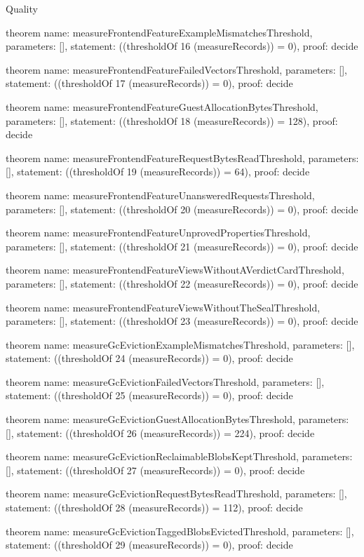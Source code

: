 \begin{lexlean}{Quality}
\begin{semanticmodule}
theorem{
  name: measureFrontendFeatureExampleMismatchesThreshold,
  parameters: [],
  statement: ((thresholdOf 16 (measureRecords)) = 0),
  proof: decide{}
}

theorem{
  name: measureFrontendFeatureFailedVectorsThreshold,
  parameters: [],
  statement: ((thresholdOf 17 (measureRecords)) = 0),
  proof: decide{}
}

theorem{
  name: measureFrontendFeatureGuestAllocationBytesThreshold,
  parameters: [],
  statement: ((thresholdOf 18 (measureRecords)) = 128),
  proof: decide{}
}

theorem{
  name: measureFrontendFeatureRequestBytesReadThreshold,
  parameters: [],
  statement: ((thresholdOf 19 (measureRecords)) = 64),
  proof: decide{}
}

theorem{
  name: measureFrontendFeatureUnansweredRequestsThreshold,
  parameters: [],
  statement: ((thresholdOf 20 (measureRecords)) = 0),
  proof: decide{}
}

theorem{
  name: measureFrontendFeatureUnprovedPropertiesThreshold,
  parameters: [],
  statement: ((thresholdOf 21 (measureRecords)) = 0),
  proof: decide{}
}

theorem{
  name: measureFrontendFeatureViewsWithoutAVerdictCardThreshold,
  parameters: [],
  statement: ((thresholdOf 22 (measureRecords)) = 0),
  proof: decide{}
}

theorem{
  name: measureFrontendFeatureViewsWithoutTheSealThreshold,
  parameters: [],
  statement: ((thresholdOf 23 (measureRecords)) = 0),
  proof: decide{}
}

theorem{
  name: measureGcEvictionExampleMismatchesThreshold,
  parameters: [],
  statement: ((thresholdOf 24 (measureRecords)) = 0),
  proof: decide{}
}

theorem{
  name: measureGcEvictionFailedVectorsThreshold,
  parameters: [],
  statement: ((thresholdOf 25 (measureRecords)) = 0),
  proof: decide{}
}

theorem{
  name: measureGcEvictionGuestAllocationBytesThreshold,
  parameters: [],
  statement: ((thresholdOf 26 (measureRecords)) = 224),
  proof: decide{}
}

theorem{
  name: measureGcEvictionReclaimableBlobsKeptThreshold,
  parameters: [],
  statement: ((thresholdOf 27 (measureRecords)) = 0),
  proof: decide{}
}

theorem{
  name: measureGcEvictionRequestBytesReadThreshold,
  parameters: [],
  statement: ((thresholdOf 28 (measureRecords)) = 112),
  proof: decide{}
}

theorem{
  name: measureGcEvictionTaggedBlobsEvictedThreshold,
  parameters: [],
  statement: ((thresholdOf 29 (measureRecords)) = 0),
  proof: decide{}
}


\end{semanticmodule}
\end{lexlean}
